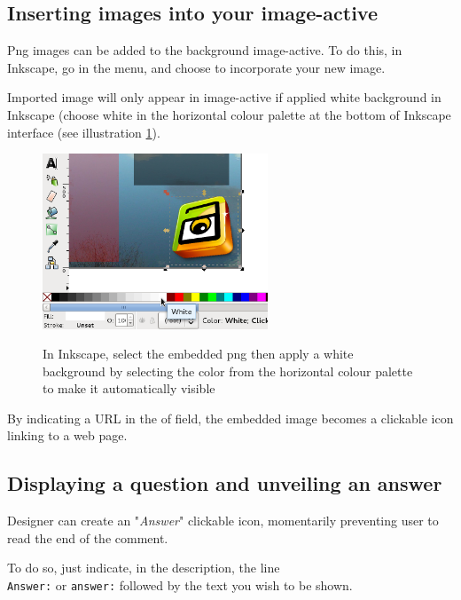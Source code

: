 \subsection{Inserting images into your image-active}\label{insertion_images}

Png images can be added to the background image-active. To do this, in 
Inkscape, go in the  menu, and choose  
to incorporate your new image.

Imported image will only appear in image-active if applied white background in 
Inkscape (choose white in the horizontal colour palette at the bottom of 
Inkscape interface (see illustration 
\ref{remplissage_blanc}).

\begin{figure}[htp]
 \centering
 \caption{In Inkscape, select the embedded png then apply a white background 
 by selecting the color from the horizontal colour palette to make it 
 automatically visible} \includegraphics[width=0.6\textwidth]
 {images/remplissage_blanc}
 \label{remplissage_blanc}
\end{figure}

By indicating a URL in the  of  field, 
the embedded image becomes a clickable icon linking to a web page.

\subsection{Displaying a question and unveiling an answer}

Designer can create an "\textit{Answer}" clickable icon, momentarily 
preventing user to read the end of the comment.

To do so, just indicate, in the description, the line\\ \verb|Answer:| or 
\verb|answer:| followed by the text you wish to be shown.

